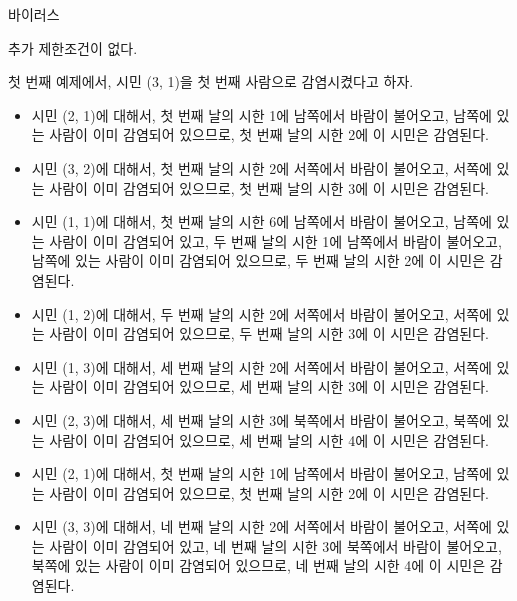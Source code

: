 \begin{problem}{바이러스}
	
	
	추가 제한조건이 없다.
	
	\Examples
	
	\begin{example}
	\end{example}
	
	\Note
	
	첫 번째 예제에서, 시민 (3, 1)을 첫 번째 사람으로 감염시켰다고 하자.
	
	\begin{itemize}
		\item 시민 (2, 1)에 대해서, 첫 번째 날의 시한 1에 남쪽에서 바람이 불어오고, 남쪽에 있는 사람이 이미 감염되어 있으므로, 첫 번째 날의 시한 2에 이 시민은 감염된다.
		\item 시민 (3, 2)에 대해서, 첫 번째 날의 시한 2에 서쪽에서 바람이 불어오고, 서쪽에 있는 사람이 이미 감염되어 있으므로, 첫 번째 날의 시한 3에 이 시민은 감염된다.
		\item 시민 (1, 1)에 대해서, 첫 번째 날의 시한 6에 남쪽에서 바람이 불어오고, 남쪽에 있는 사람이 이미 감염되어 있고, 두 번째 날의 시한 1에 남쪽에서 바람이 불어오고, 남쪽에 있는 사람이 이미 감염되어 있으므로, 두 번째 날의 시한 2에 이 시민은 감염된다.
		\item 시민 (1, 2)에 대해서, 두 번째 날의 시한 2에 서쪽에서 바람이 불어오고, 서쪽에 있는 사람이 이미 감염되어 있으므로, 두 번째 날의 시한 3에 이 시민은 감염된다.
		\item 시민 (1, 3)에 대해서, 세 번째 날의 시한 2에 서쪽에서 바람이 불어오고, 서쪽에 있는 사람이 이미 감염되어 있으므로, 세 번째 날의 시한 3에 이 시민은 감염된다.
		\item 시민 (2, 3)에 대해서, 세 번째 날의 시한 3에 북쪽에서 바람이 불어오고, 북쪽에 있는 사람이 이미 감염되어 있으므로, 세 번째 날의 시한 4에 이 시민은 감염된다.
		\item 시민 (2, 1)에 대해서, 첫 번째 날의 시한 1에 남쪽에서 바람이 불어오고, 남쪽에 있는 사람이 이미 감염되어 있으므로, 첫 번째 날의 시한 2에 이 시민은 감염된다.
		\item 시민 (3, 3)에 대해서, 네 번째 날의 시한 2에 서쪽에서 바람이 불어오고, 서쪽에 있는 사람이 이미 감염되어 있고, 네 번째 날의 시한 3에 북쪽에서 바람이 불어오고, 북쪽에 있는 사람이 이미 감염되어 있으므로, 네 번째 날의 시한 4에 이 시민은 감염된다.
	\end{itemize}


\end{problem}
